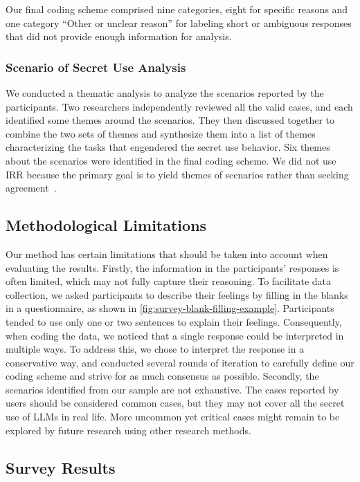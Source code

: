 Our final coding scheme comprised nine categories, eight for specific reasons and one category ``Other or unclear reason'' for labeling short or ambiguous responses that did not provide enough information for analysis.


\subsubsection{Scenario of Secret Use Analysis}

We conducted a thematic analysis to analyze the scenarios reported by the participants.
Two researchers independently reviewed all the valid cases, and each identified some themes around the scenarios.
They then discussed together to combine the two sets of themes and synthesize them into a list of themes characterizing the tasks that engendered the secret use behavior.
Six themes about the scenarios were identified in the final coding scheme.
We did not use IRR because the primary goal is to yield themes of scenarios rather than seeking agreement~\cite{mcdonald2019reliability}.


\subsection{Methodological Limitations}
Our method has certain limitations that should be taken into account when evaluating the results.
Firstly, the information in the participants' responses is often limited, which may not fully capture their reasoning.
To facilitate data collection, we asked participants to describe their feelings by filling in the blanks in a questionnaire, as shown in \autoref{fig:survey-blank-filling-example}.
Participants tended to use only one or two sentences to explain their feelings.
Consequently, when coding the data, we noticed that a single response could be interpreted in multiple ways.
To address this, we chose to interpret the response in a conservative way, and conducted several rounds of iteration to carefully define our coding scheme and strive for as much consensus as possible. 
Secondly, the scenarios identified from our sample are not exhaustive.
The cases reported by users should be considered common cases, but they may not cover all the secret use of LLMs in real life.
More uncommon yet critical cases might remain to be explored by future research using other research methods.



\subsection{Survey Results}

